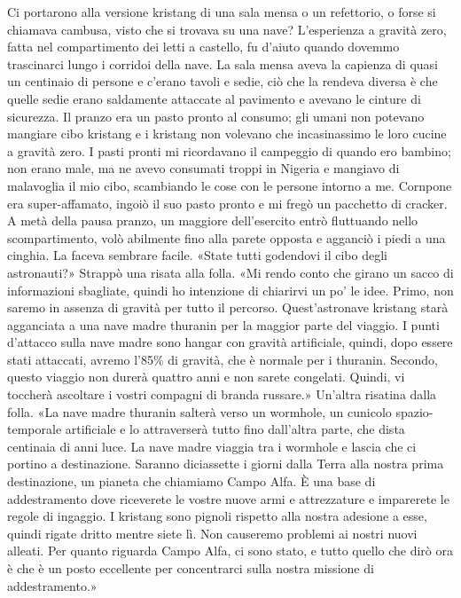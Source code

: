 Ci portarono alla versione kristang di una sala mensa o un refettorio, o
forse si chiamava cambusa, visto che si trovava su una nave?
L'esperienza a gravità zero, fatta nel compartimento dei letti a
castello, fu d'aiuto quando dovemmo trascinarci lungo i corridoi della
nave. La sala mensa aveva la capienza di quasi un centinaio di persone e
c'erano tavoli e sedie, ciò che la rendeva diversa è che quelle sedie
erano saldamente attaccate al pavimento e avevano le cinture di
sicurezza. Il pranzo era un pasto pronto al consumo; gli umani non
potevano mangiare cibo kristang e i kristang non volevano che
incasinassimo le loro cucine a gravità zero. I pasti pronti mi
ricordavano il campeggio di quando ero bambino; non erano male, ma ne
avevo consumati troppi in Nigeria e mangiavo di malavoglia il mio cibo,
scambiando le cose con le persone intorno a me. Cornpone era
super-affamato, ingoiò il suo pasto pronto e mi fregò un pacchetto di
cracker. A metà della pausa pranzo, un maggiore dell'esercito entrò
fluttuando nello scompartimento, volò abilmente fino alla parete opposta
e agganciò i piedi a una cinghia. La faceva sembrare facile. «State
tutti godendovi il cibo degli astronauti?» Strappò una risata alla
folla. «Mi rendo conto che girano un sacco di informazioni sbagliate,
quindi ho intenzione di chiarirvi un po' le idee. Primo, non saremo in
assenza di gravità per tutto il percorso. Quest'astronave kristang starà
agganciata a una nave madre thuranin per la maggior parte del viaggio. I
punti d'attacco sulla nave madre sono hangar con gravità artificiale,
quindi, dopo essere stati attaccati, avremo l'85\% di gravità, che è
normale per i thuranin. Secondo, questo viaggio non durerà quattro anni
e non sarete congelati. Quindi, vi toccherà ascoltare i vostri compagni
di branda russare.» Un'altra risatina dalla folla. «La nave madre
thuranin salterà verso un wormhole, un cunicolo spazio-temporale
artificiale e lo attraverserà tutto fino dall'altra parte, che dista
centinaia di anni luce. La nave madre viaggia tra i wormhole e lascia
che ci portino a destinazione. Saranno diciassette i giorni dalla Terra
alla nostra prima destinazione, un pianeta che chiamiamo Campo Alfa. È
una base di addestramento dove riceverete le vostre nuove armi e
attrezzature e imparerete le regole di ingaggio. I kristang sono pignoli
rispetto alla nostra adesione a esse, quindi rigate dritto mentre siete
lì. Non causeremo problemi ai nostri nuovi alleati. Per quanto riguarda
Campo Alfa, ci sono stato, e tutto quello che dirò ora è che è un posto
eccellente per concentrarci sulla nostra missione di addestramento.»

